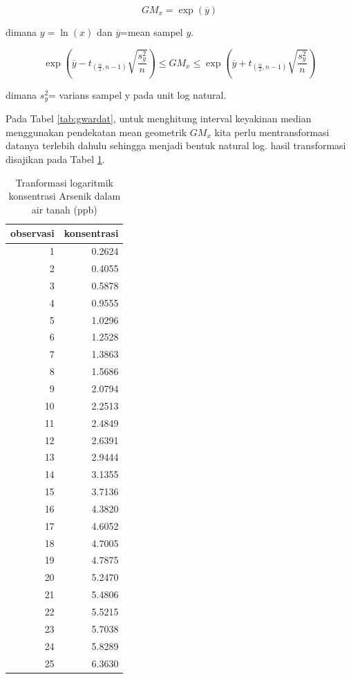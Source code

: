 \documentclass[]{book}
\begin{document}
\begin{equation}
  GM_x=\exp\left(\overline{y}\right) 
  \label{eq:gmci}
\end{equation}

dimana \(y=\ln(x)\) dan \(\overline{y}\)=mean sampel \(y\).

\begin{equation}
  \exp\left(\overline{y}-t_{\left(\frac{\alpha}{2},n-1\right)}\sqrt{\frac{s_y^2}{n}}\right)\le GM_x\le\exp\left(\overline{y}+t_{\left(\frac{\alpha}{2},n-1\right)}\sqrt{\frac{s_y^2}{n}}\right) 
  \label{eq:gmci2}
\end{equation}

dimana \(s_{y}^2\)= varians sampel y pada unit log natural.

Pada Tabel \ref{tab:gwardat}, untuk menghitung interval keyakinan median
menggunakan pendekatan mean geometrik \(GM_x\) kita perlu
mentransformasi datanya terlebih dahulu sehingga menjadi bentuk natural
log. hasil transformasi disajikan pada Tabel \ref{tab:gwardat2}.

\begin{table}[t]

\caption{\label{tab:gwardat2}Tranformasi logaritmik konsentrasi Arsenik dalam air tanah (ppb)}
\centering
\begin{tabular}{r|r}
\hline
observasi & konsentrasi\\
\hline
1 & 0.2624\\
\hline
2 & 0.4055\\
\hline
3 & 0.5878\\
\hline
4 & 0.9555\\
\hline
5 & 1.0296\\
\hline
6 & 1.2528\\
\hline
7 & 1.3863\\
\hline
8 & 1.5686\\
\hline
9 & 2.0794\\
\hline
10 & 2.2513\\
\hline
11 & 2.4849\\
\hline
12 & 2.6391\\
\hline
13 & 2.9444\\
\hline
14 & 3.1355\\
\hline
15 & 3.7136\\
\hline
16 & 4.3820\\
\hline
17 & 4.6052\\
\hline
18 & 4.7005\\
\hline
19 & 4.7875\\
\hline
20 & 5.2470\\
\hline
21 & 5.4806\\
\hline
22 & 5.5215\\
\hline
23 & 5.7038\\
\hline
24 & 5.8289\\
\hline
25 & 6.3630\\
\hline
\end{tabular}
\end{table}
\end{document}
